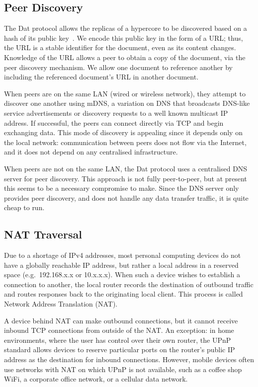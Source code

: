 \documentclass[sigplan,10pt]{acmart}
\begin{document}
\subsection{Peer Discovery}\label{sec:peer-discovery}

The Dat protocol allows the replicas of a hypercore to be discovered based on a hash of its public key~\cite{HowDatWorks}.
We encode this public key in the form of a URL; thus, the URL is a stable identifier for the document, even as its content changes.
Knowledge of the URL allows a peer to obtain a copy of the document, via the peer discovery mechanism.
We allow one document to reference another by including the referenced document's URL in another document.

When peers are on the same LAN (wired or wireless network), they attempt to discover one another using mDNS, a variation on DNS that broadcasts DNS-like service advertisements or discovery requests to a well known multicast IP address.
If successful, the peers can connect directly via TCP and begin exchanging data.
This mode of discovery is appealing since it depends only on the local network: communication between peers does not flow via the Internet, and it does not depend on any centralised infrastructure.

When peers are not on the same LAN, the Dat protocol uses a centralised DNS server for peer discovery.
This approach is not fully peer-to-peer, but at present this seems to be a necessary compromise to make.
Since the DNS server only provides peer discovery, and does not handle any data transfer traffic, it is quite cheap to run.

\subsection{NAT Traversal}\label{sec:nat-traversal}

Due to a shortage of IPv4 addresses, most personal computing devices do not have a globally reachable IP address, but rather a local address in a reserved space (e.g.\ 192.168.x.x or 10.x.x.x).
When such a device wishes to establish a connection to another, the local router records the destination of outbound traffic and routes responses back to the originating local client.
This process is called Network Address Translation (NAT).

A device behind NAT can make outbound connections, but it cannot receive inbound TCP connections from outside of the NAT.
An exception: in home environments, where the user has control over their own router, the UPnP standard allows devices to reserve particular ports on the router's public IP address as the destination for inbound connections.
However, mobile devices often use networks with NAT on which UPnP is not available, such as a coffee shop WiFi, a corporate office network, or a cellular data network.
\end{document}
